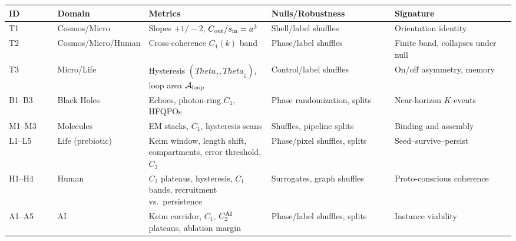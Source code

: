 \documentclass[12pt,a4paper,oneside]{scrreprt}
\def\Theta{Theta}%
\begin{document}
\begin{longtable}{p{0.1\linewidth} p{0.15\linewidth} p{0.25\linewidth} p{0.25\linewidth} p{0.25\linewidth}}
\toprule
\textbf{ID} & \textbf{Domain} & \textbf{Metrics} & \textbf{Nulls/Robustness} & \textbf{Signature} \\
\midrule
T1 & Cosmos/Micro & Slopes $+1/-2$, $C_{\rm out}/s_{\rm in}=a^3$ & Shell/label shuffles & Orientation identity \\
T2 & Cosmos/Micro/Human & Cross-coherence $C_1(k)$ band & Phase/label shuffles & Finite band, collapses under null \\
T3 & Micro/Life & Hysteresis $(\Theta_\uparrow,\Theta_\downarrow)$, loop area $\mathcal A_{\rm loop}$ & Control/label shuffles & On/off asymmetry, memory \\
B1–B3 & Black Holes & Echoes, photon-ring $C_1$, HFQPOs & Phase randomization, splits & Near-horizon $K$-events \\
M1–M3 & Molecules & EM stacks, $C_1$, hysteresis scans & Shuffles, pipeline splits & Binding and assembly \\
L1–L5 & Life (prebiotic) & Keim window, length shift, compartments, error threshold, $C_2$ & Phase/pixel shuffles, splits & Seed–survive–persist \\
H1–H4 & Human & $C_2$ plateaus, hysteresis, $C_1$ bands, recruitment vs.\ persistence & Surrogates, graph shuffles & Proto-conscious coherence \\
A1–A5 & AI & Keim corridor, $C_1$, $C_2^{\rm AI}$ plateaus, ablation margin & Phase/label shuffles, splits & Instance viability \\
\bottomrule
\end{longtable}

\appendix
\end{document}
